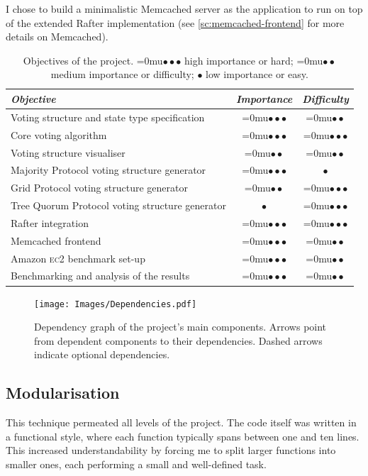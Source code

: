 \documentclass[12pt,chapterprefix=true,toc=bibliography,numbers=noendperiod,
               footnotes=multiple,twoside]{scrreprt}
\newcommand{\ECC}[0]{\textsc{ec}2}
\newcommand{\zerospacing}[0]{\medmuskip=0mu}
\newcommand{\high}[0]{{\color{purple!90}\zerospacing \(\bullet \bullet \bullet\)} }
\newcommand{\hard}[0]{{\color{purple!90}\zerospacing \(\bullet \bullet \bullet\)} }
\newcommand{\medium}[0]{{\color{violet!80}\zerospacing \(\bullet \bullet\)} }
\newcommand{\easy}[0]{{\color{teal!80}\(\bullet\)} }
\newcommand{\low}[0]{{\color{teal!80}\(\bullet\)} }
\begin{document}
I chose to build a minimalistic Memcached server as the application to run on top of the extended Rafter implementation (see \cref{sc:memcached-frontend} for more details on Memcached).

\begin{table}[h]
    \centering
    \begin{tabularx}{\textwidth}{X c c}
        \toprule
        \textit{Objective} & \textit{Importance} & \textit{Difficulty} \\
        \midrule
        Voting structure and state type specification & \high & \medium \\
        Core voting algorithm & \high & \hard \\
        Voting structure visualiser & \medium & \medium \\
        Majority Protocol voting structure generator & \high & \easy \\
        Grid Protocol voting structure generator & \medium & \hard \\
        Tree Quorum Protocol voting structure generator & \low & \hard \\
        Rafter integration & \high & \hard \\
        Memcached frontend & \high & \medium \\
        Amazon \ECC{} benchmark set-up & \high & \medium \\
        Benchmarking and analysis of the results & \high & \medium \\
        \bottomrule
    \end{tabularx}
    \caption{Objectives of the project. \high high importance or hard; \medium medium importance or difficulty; \low low importance or easy.}
    \label{tab:objectives}
\end{table}

\begin{figure}[h]
    \centering
    \texttt{[image: Images/Dependencies.pdf]}
    \caption{Dependency graph of the project's main components. Arrows point from dependent components to their dependencies. Dashed arrows indicate optional dependencies.}
    \label{fig:dependencies}
\end{figure}

\subsection{Modularisation}

This technique permeated all levels of the project. The code itself was written in a functional style, where each function typically spans between one and ten lines. This increased understandability by forcing me to split larger functions into smaller ones, each performing a small and well-defined task.
\end{document}

